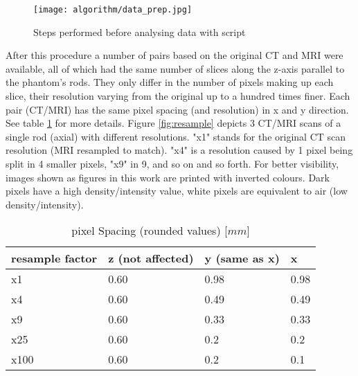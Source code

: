 \begin{figure}[!tbp]
\centering
\texttt{[image: algorithm/data\_prep.jpg]}
\caption{Steps performed before analysing data with script }
\label{fig:data_prep}
\end{figure}

After this procedure a number of pairs based on the original CT and MRI were available, all of which had the same number of slices along the z-axis parallel to the phantom's rods.
They only differ in the number of pixels making up each slice, their resolution varying from the original up to a hundred times finer.
Each pair (CT/MRI) has the same pixel spacing (and resolution) in x and y direction.
See table \ref{tab:spacing} for more details.
Figure \ref{fig:resample} depicts 3 CT/MRI scans of a single rod (axial) with different resolutions.
"x1" stands for the original CT scan resolution (MRI resampled to match).
"x4" is a resolution caused by 1 pixel being split in 4 smaller pixels, "x9" in 9, and so on and so forth.
For better visibility, images shown as figures in this work are printed with inverted colours.
Dark pixels have a high density/intensity value, white pixels are equivalent to air (low density/intensity).

\begin{table}[!htb]
\centering
\begin{tabular}{l|l|l|l}
resample factor  & z (not affected) &  y (same as x) & x \\
\toprule
x1     & 0.60 & 0.98	& 0.98	\\
x4     & 0.60 & 0.49	& 0.49	\\
x9     & 0.60 & 0.33	& 0.33	\\
x25    & 0.60 & 0.2 	& 0.2	\\
x100   & 0.60 & 0.2 	& 0.1
\end{tabular}
\caption{pixel Spacing (rounded values) [$mm$]}
\label{tab:spacing}
\end{table}


